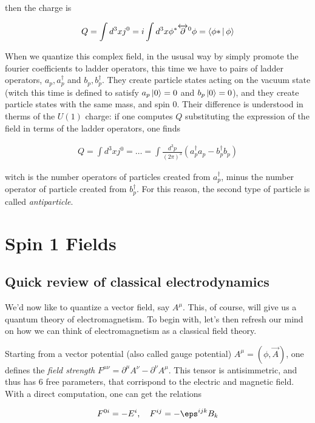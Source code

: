 \documentclass{report}
\begin{document}
then the charge is 

\begin{align}
    Q = \int d^3x j^0 = i\int d^3x \phi^*\overleftrightarrow{\partial}^0 \phi = \Braket{\phi* | \phi}
\end{align}

When we quantize this complex field, in the ususal way by simply promote the fourier coefficients to ladder operators, this time we have to pairs of ladder operators, \(a_p, a^\dagger_p\) and \(b_p, b^\dagger_p\). They create particle states acting on the vacuum state (witch this time is defined to satisfy \(a_p\ket{0} = 0\) and \(b_p\ket{0} = 0\)), and they create particle states with the same mass, and spin 0. Their difference is understood in therms of the \(U(1)\) charge: if one computes \(Q\) substituting the expression of the field in terms of the ladder operators, one finds 

\begin{align}
    Q = \int d^3x j^0 = \ldots = \int \frac{d^3p}{(2\pi)^3}(a_p^\dagger a_p - b_p^\dagger b_p)
\end{align}

witch is the number operators of particles created from \(a^\dagger_p\), minus the number operator of particle created from \(b_p^\dagger\). For this reason, the second type of particle is called \emph{antiparticle}. 


\chapter{Spin 1 Fields}

\section{Quick review of classical electrodynamics}

We'd now like to quantize a vector field, say \(A^\mu\). This, of course, will give us a quantum theory of electromagnetism. To begin with, let's then refresh our mind on how we can think of electromagnetism as a classical field theory. 

Starting from a vector potential (also called gauge potential) \(A^\mu = (\phi, \vec{A})\), one defines the \emph{field strength} \(F^{\mu\nu} = \partial^\mu A^\nu - \partial^\nu A^\mu\). This tensor is antisimmetric, and thus has 6 free parameters, that corrispond to the electric and magnetic field. With a direct computation, one can get the relations 

\begin{align}
    F^{0i} = -E^i, \quad F^{ij} = -\eps^{ijk}B_k
\end{align}
\end{document}
